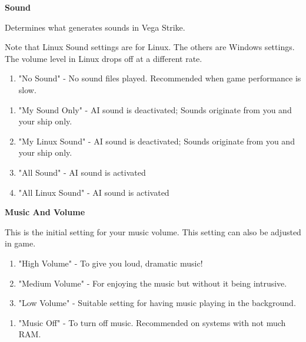 \documentclass{article}
\begin{document}
\eject 

\textbf{Sound }

Determines what generates sounds in Vega Strike.



Note that Linux Sound settings are for Linux. The others are Windows settings. The volume level in Linux drops off at a different rate.



\begin{enumerate}
\item  "No Sound" - No sound files played. Recommended when game performance is slow.
\end{enumerate}



\begin{enumerate}
\item  "My Sound Only" - AI sound is deactivated; Sounds originate from you and your ship only.  

\item  "My Linux Sound" - AI sound is deactivated; Sounds originate from you and your ship only. 

\item  "All Sound" - AI sound is activated  

\item  "All Linux Sound" - AI sound is activated  
\end{enumerate}



\textbf{Music And Volume }

This is the initial setting for your music volume. This setting can also be adjusted in game. 



\begin{enumerate}
\item  "High Volume" - To give you loud, dramatic music! 

\item  "Medium Volume" - For enjoying the music but without it being intrusive. 

\item  "Low Volume" - Suitable setting for having music playing in the background.
\end{enumerate}



\begin{enumerate}
\item  "Music Off" - To turn off music.  Recommended on systems with not much RAM.
\end{enumerate}
\end{document}
